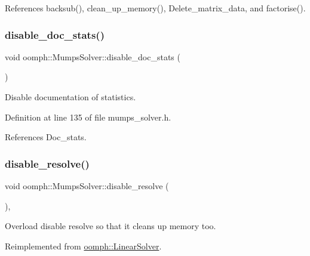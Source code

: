 References backsub(), clean\+\_\+up\+\_\+memory(), Delete\+\_\+matrix\+\_\+data, and factorise().

\mbox{\label{classoomph_1_1MumpsSolver_a8f64fcf52cb7cbf89b75da1d794dee5f}} 
\subsubsection{\texorpdfstring{disable\+\_\+doc\+\_\+stats()}{disable\_doc\_stats()}}
{\footnotesize\ttfamily void oomph\+::\+Mumps\+Solver\+::disable\+\_\+doc\+\_\+stats (\begin{DoxyParamCaption}{ }\end{DoxyParamCaption})\hspace{0.3cm}{\ttfamily [inline]}}



Disable documentation of statistics. 



Definition at line 135 of file mumps\+\_\+solver.\+h.



References Doc\+\_\+stats.

\mbox{\label{classoomph_1_1MumpsSolver_aba2b1c844e190da45c8adbd6dfc0f344}} 
\subsubsection{\texorpdfstring{disable\+\_\+resolve()}{disable\_resolve()}}
{\footnotesize\ttfamily void oomph\+::\+Mumps\+Solver\+::disable\+\_\+resolve (\begin{DoxyParamCaption}{ }\end{DoxyParamCaption})\hspace{0.3cm}{\ttfamily [inline]}, {\ttfamily [virtual]}}



Overload disable resolve so that it cleans up memory too. 



Reimplemented from \hyperlink{classoomph_1_1LinearSolver_ad61c63af94c5961830bd9807225a48d6}{oomph\+::\+Linear\+Solver}.



